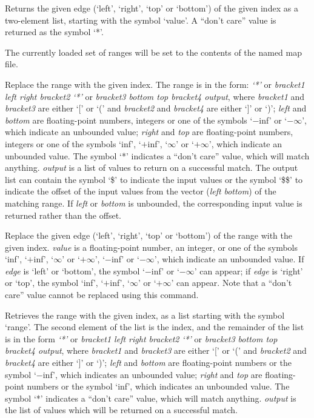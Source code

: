   Returns the given edge (`left', `right', `top' or `bottom') of the given index as a two-element list,
  starting with the symbol `value'.
  A ``don't care'' value is returned as the symbol `*'.

  The currently loaded set of ranges will be set to the contents of the named map file.
  
  Replace the range with the given index.
  The range is in the form: \emph{`*'} or \emph{bracket1 left right bracket2} \emph{`*'} or \emph{bracket3 bottom top bracket4 output}, where
  \emph{bracket1} and \emph{bracket3} are either `[' or `(' and \emph{bracket2} and \emph{bracket4} are
  either `]' or `)';
  \emph{left} and \emph{bottom} are floating-point numbers, integers or one of the symbols `$-$inf' or
  `$-\infty$', which indicate an unbounded value;
  \emph{right} and \emph{top} are floating-point numbers, integers or one of the symbols `inf', `$+$inf',
  `$\infty$' or `$+\infty$', which indicate an unbounded value.
  The symbol `*' indicates a ``don't care'' value, which will match anything.
  \emph{output} is a list of values to return on a successful match.
  The output list can contain the symbol `\$' to indicate the input values or the symbol `\$\$' to
  indicate the offset of the input values from the vector (\emph{left} \emph{bottom}) of the matching range.
  If \emph{left} or \emph{bottom} is unbounded, the corresponding input value is returned rather than the offset.

  Replace the given edge (`left', `right', `top' or `bottom') of the range with the
  given index.
  \emph{value} is a floating-point number, an integer, or one of the symbols `inf', `$+$inf',
  `$\infty$' or `$+\infty$', `$-$inf' or `$-\infty$', which indicate an unbounded value.
  If \emph{edge} is `left' or `bottom', the symbol `$-$inf' or `$-\infty$' can appear;
  if \emph{edge} is `right' or `top', the symbol `inf', `$+$inf', `$\infty$' or `$+\infty$' can appear.
  Note that a ``don't care'' value cannot be replaced using this command.

  Retrieves the range with the given index, as a list starting with the symbol `range'.
  The second element of the list is the index, and the remainder of the list is in the form
  \emph{`*'} or \emph{bracket1 left right bracket2} \emph{`*'} or \emph{bracket3 bottom top bracket4 output},
  where \emph{bracket1} and \emph{bracket3} are either `[' or `(' and \emph{bracket2} and \emph{bracket4}
  are either `]' or `)'; \emph{left} and \emph{bottom} are floating-point numbers or the symbol `$-$inf',
  which indicates an unbounded value; \emph{right} and \emph{top} are floating-point numbers or
  the symbol `inf', which indicates an unbounded value.
  The symbol `*' indicates a ``don't care'' value, which will match anything.
  \emph{output} is the list of values which will be returned on a successful match.

